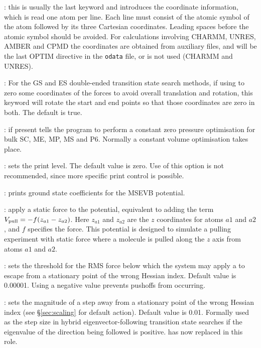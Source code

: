 {{{: this is usually the last keyword and introduces the
coordinate information, which is read one atom per line. Each line must consist
of the atomic symbol of the atom followed by its three Cartesian coordinates.
Leading spaces before the atomic symbol should be avoided. For calculations
involving CHARMM, UNRES, AMBER and CPMD the coordinates are obtained from auxiliary files, 
and  will be the last OPTIM directive in the {\tt odata} file, or
is not used (CHARMM and UNRES).

: For the GS and ES double-ended transition state
  search methods, if using {} to zero some coordinates of the
  forces to avoid overall translation and rotation, this keyword will rotate
  the start and end points so that those coordinates are zero in both.
The default is true.

: if present 
tells the program to perform a constant zero pressure optimisation
for bulk SC, ME, MP, MS and P6. Normally a constant volume optimisation takes place. 

: sets the print level. The default value is zero. Use
of this option is not recommended, since more specific print control is possible.

: prints ground state coefficients for the MSEVB potential.

: apply a static force to the potential, equivalent to adding
the term $V_{\rm pull}=-f(z_{a1}-z_{a2})$. Here $z_{a1}$ and $z_{a2}$ are the $z$
coordinates for atoms $a1$ and $a2$, and $f$ specifies the force.
This potential is designed to simulate a pulling experiment with static force where
a molecule is pulled along the $z$ axis from atoms $a1$ and $a2$.

: sets the threshold for the RMS force below which the
system may apply a {} to escape from a stationary point of the wrong Hessian
index. Default value is 0.00001. Using a negative value prevents pushoffs from
occurring.

: sets the magnitude of a step away from a stationary
point of the wrong Hessian index (see \S\ref{sec:scaling} for default action). Default value is 0.01.
Formally used as the step size in hybrid eigenvector-following
transition state searches if the eigenvalue of the direction being followed is positive.
{} has now replaced {} in this role.

}}}
